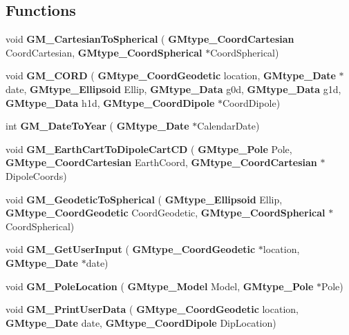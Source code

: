 \subsection*{Functions}
\begin{DoxyCompactItemize}
\item 
\mbox{\label{_g_m___sub_library_8c_a81c43513c2b987eacf3844a188d3c7d5}} 
void {\bfseries G\+M\+\_\+\+Cartesian\+To\+Spherical} (\textbf{ G\+Mtype\+\_\+\+Coord\+Cartesian} Coord\+Cartesian, \textbf{ G\+Mtype\+\_\+\+Coord\+Spherical} $\ast$Coord\+Spherical)
\item 
\mbox{\label{_g_m___sub_library_8c_a58d6894c0973ed1e7cc67fc363032950}} 
void {\bfseries G\+M\+\_\+\+C\+O\+RD} (\textbf{ G\+Mtype\+\_\+\+Coord\+Geodetic} location, \textbf{ G\+Mtype\+\_\+\+Date} $\ast$date, \textbf{ G\+Mtype\+\_\+\+Ellipsoid} Ellip, \textbf{ G\+Mtype\+\_\+\+Data} g0d, \textbf{ G\+Mtype\+\_\+\+Data} g1d, \textbf{ G\+Mtype\+\_\+\+Data} h1d, \textbf{ G\+Mtype\+\_\+\+Coord\+Dipole} $\ast$Coord\+Dipole)
\item 
\mbox{\label{_g_m___sub_library_8c_aba182fbcc2ae8460978471b7594aaf87}} 
int {\bfseries G\+M\+\_\+\+Date\+To\+Year} (\textbf{ G\+Mtype\+\_\+\+Date} $\ast$Calendar\+Date)
\item 
\mbox{\label{_g_m___sub_library_8c_ae798bc9a8c401807727fb1357a298ff8}} 
void {\bfseries G\+M\+\_\+\+Earth\+Cart\+To\+Dipole\+Cart\+CD} (\textbf{ G\+Mtype\+\_\+\+Pole} Pole, \textbf{ G\+Mtype\+\_\+\+Coord\+Cartesian} Earth\+Coord, \textbf{ G\+Mtype\+\_\+\+Coord\+Cartesian} $\ast$Dipole\+Coords)
\item 
\mbox{\label{_g_m___sub_library_8c_aeb56a92137f38228f30e5a543fae7755}} 
void {\bfseries G\+M\+\_\+\+Geodetic\+To\+Spherical} (\textbf{ G\+Mtype\+\_\+\+Ellipsoid} Ellip, \textbf{ G\+Mtype\+\_\+\+Coord\+Geodetic} Coord\+Geodetic, \textbf{ G\+Mtype\+\_\+\+Coord\+Spherical} $\ast$Coord\+Spherical)
\item 
\mbox{\label{_g_m___sub_library_8c_a3562a3ba9b56477cd4d5ecdcb784532c}} 
void {\bfseries G\+M\+\_\+\+Get\+User\+Input} (\textbf{ G\+Mtype\+\_\+\+Coord\+Geodetic} $\ast$location, \textbf{ G\+Mtype\+\_\+\+Date} $\ast$date)
\item 
\mbox{\label{_g_m___sub_library_8c_ac2fbcd2149675927463c6be7752c134d}} 
void {\bfseries G\+M\+\_\+\+Pole\+Location} (\textbf{ G\+Mtype\+\_\+\+Model} Model, \textbf{ G\+Mtype\+\_\+\+Pole} $\ast$Pole)
\item 
\mbox{\label{_g_m___sub_library_8c_a8567ee98b2672e278743a04696999a96}} 
void {\bfseries G\+M\+\_\+\+Print\+User\+Data} (\textbf{ G\+Mtype\+\_\+\+Coord\+Geodetic} location, \textbf{ G\+Mtype\+\_\+\+Date} date, \textbf{ G\+Mtype\+\_\+\+Coord\+Dipole} Dip\+Location)

\end{DoxyCompactItemize}
